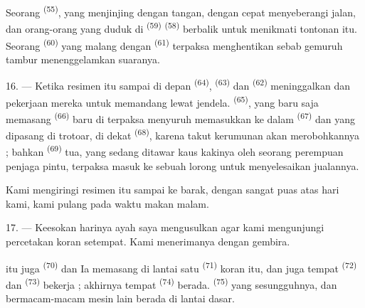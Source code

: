 \VUsaut{3.0mm}

Seorang  \textsuperscript{(55)}, yang
menjinjing  dengan tangan, dengan cepat
menyeberangi jalan, dan orang-orang yang duduk di 
\textsuperscript{(59)}  \textsuperscript{(58)} berbalik
untuk menikmati tontonan itu. Seorang 
\textsuperscript{(60)} yang malang dengan 
\textsuperscript{(61)} terpaksa menghentikan  sebab
gemuruh tambur menenggelamkan suaranya.

16. --- Ketika resimen itu sampai di depan 
\textsuperscript{(64)}, 
\textsuperscript{(63)} dan  \textsuperscript{(62)}
meninggalkan  dan pekerjaan mereka untuk memandang
lewat jendela.  \textsuperscript{(65)}, yang baru saja
memasang  \textsuperscript{(66)} baru di
 terpaksa menyuruh memasukkan ke dalam
 \textsuperscript{(67)} dan 
yang dipasang di trotoar, di dekat 
\textsuperscript{(68)}, karena takut kerumunan akan merobohkannya ;
bahkan  \textsuperscript{(69)} tua, yang
sedang ditawar kaus kakinya oleh seorang perempuan penjaga pintu,
terpaksa masuk ke sebuah lorong untuk menyelesaikan jualannya.

Kami mengiringi resimen itu sampai ke barak,  dengan
sangat puas atas hari kami, kami pulang pada waktu makan malam.

\VUsaut{3.0mm}

17. --- Keesokan harinya ayah saya mengusulkan agar kami mengunjungi
percetakan koran setempat. Kami menerimanya dengan gembira.

 itu juga  \textsuperscript{(70)}
   dan  Ia memasang di lantai satu
 \textsuperscript{(71)} koran itu, dan juga
 tempat 
\textsuperscript{(72)} dan 
\textsuperscript{(73)} bekerja ; akhirnya 
tempat  \textsuperscript{(74)} berada.
 \textsuperscript{(75)} yang sesungguhnya,
 dan bermacam-macam mesin lain berada di
lantai dasar.

